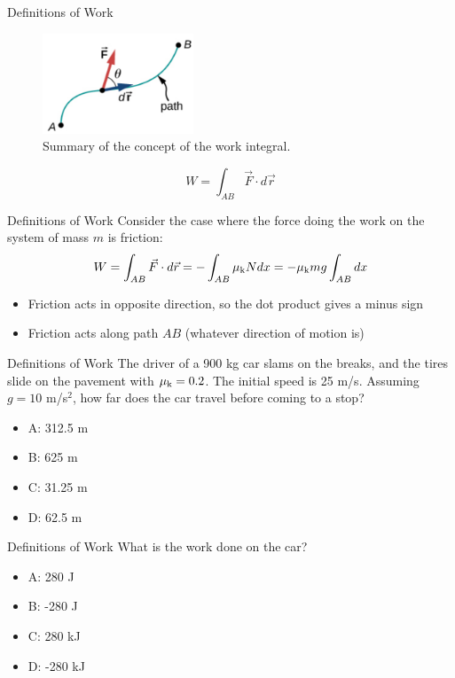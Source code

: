 \documentclass{beamer}
\begin{document}
\begin{frame}{Definitions of Work}
\begin{figure}
\centering
\includegraphics[width=0.4\textwidth]{figures/line.png}
\caption{\label{fig:line} Summary of the concept of the work integral.}
\end{figure}
\begin{equation}
W = \int_{AB} \vec{F} \cdot d\vec{r}
\end{equation}
\end{frame}

\begin{frame}{Definitions of Work}
Consider the case where the force doing the work on the system of mass $m$ is friction:
\begin{equation}
W = \int_{AB} \vec{F} \cdot d\vec{r} = -\int_{AB} \mu_{\rm k} N dx = -\mu_{\rm k} m g \int_{AB} dx 
\end{equation}
\small
\begin{itemize}
\item Friction acts in opposite direction, so the dot product gives a minus sign
\item Friction acts along path $AB$ (whatever direction of motion is)
\end{itemize}
\end{frame}

\begin{frame}{Definitions of Work}
The driver of a 900 kg car slams on the breaks, and the tires slide on the pavement with $\mu_{\rm k} = 0.2$.  The initial speed is 25 m/s.  Assuming $g = 10$ m/s$^2$, how far does the car travel before coming to a stop?
\begin{itemize}
\item A: 312.5 m
\item B: 625 m
\item C: 31.25 m
\item D: 62.5 m
\end{itemize}
\end{frame}

\begin{frame}{Definitions of Work}
What is the work done on the car?
\begin{itemize}
\item A: 280 J
\item B: -280 J
\item C: 280 kJ
\item D: -280 kJ
\end{itemize}
\end{frame}
\end{document}
